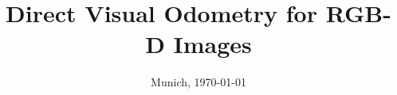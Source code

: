%
% 
% 
%






\renewcommand{\PraesentationFusszeileZusatz}{| Vision-based Navigation | Direct Visual Odometry for RGB-D Images}

\title{Direct Visual Odometry for RGB-D Images}
\author{\PersonVorname{} \PersonNachname}
\institute[]{\UniversitaetName}
\date[\Datum]{Munich, \today}
\subject{Direct Visual Odometry for RGB-D Images}




\PraesentationMasterStandard

\PraesentationTitelseite %




